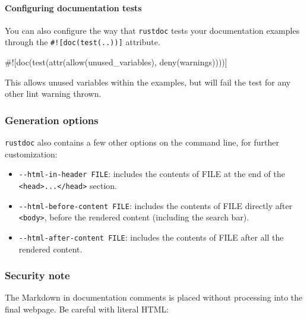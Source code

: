 \documentclass[a4paper,]{book}
\newenvironment{Shaded}{\begin{snugshade}}{\end{snugshade}}
\newcommand{\AttributeTok}[1]{\textcolor[rgb]{0.77,0.63,0.00}{{#1}}}
\newcommand{\NormalTok}[1]{{#1}}
\providecommand{\tightlist}{%
  \setlength{\itemsep}{0pt}\setlength{\parskip}{0pt}}
\let\oldparagraph\paragraph
\renewcommand{\paragraph}[1]{\oldparagraph{#1}\mbox{}}
\begin{document}
\paragraph{Configuring documentation
tests}\label{configuring-documentation-tests}

You can also configure the way that \texttt{rustdoc} tests your
documentation examples through the \texttt{\#!{[}doc(test(..)){]}}
attribute.

\begin{Shaded}
\begin{Highlighting}[]
\AttributeTok{#![}\NormalTok{doc}\AttributeTok{(}\NormalTok{test}\AttributeTok{(}\NormalTok{attr}\AttributeTok{(}\NormalTok{allow}\AttributeTok{(}\NormalTok{unused_variables}\AttributeTok{),} \NormalTok{deny}\AttributeTok{(}\NormalTok{warnings}\AttributeTok{))))]}
\end{Highlighting}
\end{Shaded}

This allows unused variables within the examples, but will fail the test
for any other lint warning thrown.

\subsubsection{Generation options}\label{generation-options}

\texttt{rustdoc} also contains a few other options on the command line,
for further customization:

\begin{itemize}
\tightlist
\item
  \texttt{-\/-html-in-header\ FILE}: includes the contents of FILE at
  the end of the
  \texttt{\textless{}head\textgreater{}...\textless{}/head\textgreater{}}
  section.
\item
  \texttt{-\/-html-before-content\ FILE}: includes the contents of FILE
  directly after \texttt{\textless{}body\textgreater{}}, before the
  rendered content (including the search bar).
\item
  \texttt{-\/-html-after-content\ FILE}: includes the contents of FILE
  after all the rendered content.
\end{itemize}

\subsubsection{Security note}\label{security-note}

The Markdown in documentation comments is placed without processing into
the final webpage. Be careful with literal HTML:
\end{document}

